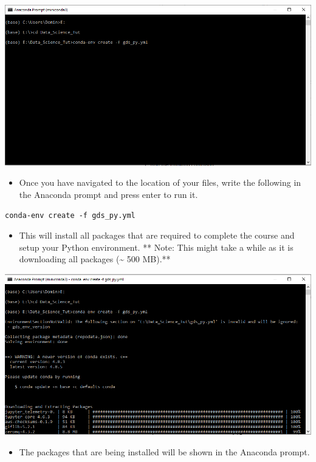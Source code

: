 \documentclass[
]{book}
\providecommand{\tightlist}{%
  \setlength{\itemsep}{0pt}\setlength{\parskip}{0pt}}
\begin{document}
\begin{center}\includegraphics[width=13.6in]{figs/chp4/Conda_4} \end{center}

\begin{itemize}
\tightlist
\item
  Once you have navigated to the location of your files, write the following in the Anaconda prompt and press enter to run it.
\end{itemize}

\texttt{conda-env\ create\ -f\ gds\_py.yml}

\begin{itemize}
\tightlist
\item
  This will install all packages that are required to complete the course and setup your Python environment.
  ** Note: This might take a while as it is downloading all packages (\textasciitilde{} 500 MB).**
\end{itemize}

\begin{center}\includegraphics[width=13.58in]{figs/chp4/Conda_6} \end{center}

\begin{itemize}
\tightlist
\item
  The packages that are being installed will be shown in the Anaconda prompt.
\end{itemize}
\end{document}
